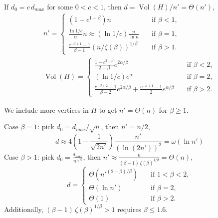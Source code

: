 \documentclass{beamer}
\DeclareMathOperator*{\Vol}{Vol}
\newcommand{\autotitle}{\secname\ifdefempty{\subsecname}{}{~--- \subsecname}}
\newcommand{\smalldisplayskips}{
    \setlength{\abovedisplayskip}{3pt}
    \setlength{\belowdisplayskip}{3pt}}
\begin{document}
\begin{frame}{\autotitle}
    \small
    \begin{lemma}
        If $d_0=c\,d_{max}$ for some $0<c<1$, then $d=\Vol(H)/n'=\Theta(n')$,
        \begin{gather*}
            n'=
            \begin{cases}
                \left(1-c^{1-\beta}\right)n & \quad \text{if } \beta<1,\\
                \frac{\ln 1/c}{\alpha}n\approx\left(\ln 1/c\right)\frac{n}{\ln n} & \quad \text{if } \beta=1,\\
                \frac{c^{-\beta+1}-1}{\beta-1}\left(n/\zeta(\beta)\right)^{1/\beta} & \quad \text{if } \beta>1. %
            \end{cases}\\
            \Vol(H)=
            \begin{cases}
                \frac{1-c^{2-\beta}}{2-\beta}e^{2\alpha/\beta} & \quad \text{if } \beta<2,\\
                \left(\ln 1/c\right)e^\alpha & \quad \text{if } \beta=2,\\
                \frac{c^{-\beta+2}-1}{\beta-2}e^{2\alpha/\beta}+\frac{c^{-\beta+1}-1}{2}e^{\alpha/\beta} & \quad \text{if } \beta>2.
            \end{cases}
        \end{gather*}
    \end{lemma}
\end{frame}

\begin{frame}{\autotitle}
    We include more vertices in $H$ to get $n'=\Theta(n)$ for $\beta\geq 1$.
    \small\smalldisplayskips
    \begin{lemma}
        Case $\beta=1$: pick $d_0=d_{max}/\sqrt{n}$, then $n'=n/2$,
        \begin{equation*}
            d\approx4\left(1-\frac{1}{\sqrt{2n'}}\right)\frac{n'}{(\ln (2n'))^2}=\omega(\ln n')
        \end{equation*}
        Case $\beta>1$: pick $d_0=\frac{d_{max}}{n^{1/\beta}}$, then
        $n'\approx\frac{n}{(\beta-1)\,\zeta(\beta)^{1/\beta}}=\Theta(n)$,
        \begin{equation*}
            d=
            \begin{cases}
                \Theta\left(n'^{(2-\beta)/\beta}\right) & \quad \text{if } 1<\beta<2,\\
                \Theta(\ln n') & \quad \text{if } \beta=2,\\
                \Theta(1) & \quad \text{if } \beta>2.
            \end{cases}
        \end{equation*}
        Additionally, $(\beta-1)\,\zeta(\beta)^{1/\beta}>1$ requires $\beta\leq 1.6$.
    \end{lemma}
\end{frame}
\end{document}
